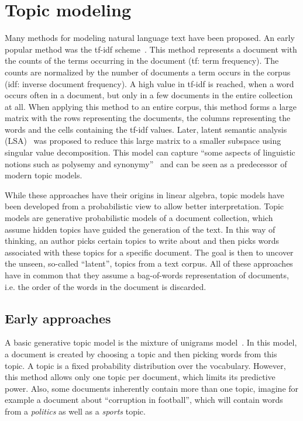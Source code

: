 \documentclass[
        a4paper,
        titlepage,
        twoside,
        parskip,
        numbers=noenddot
        ]{scrbook}
\theoremstyle{break}
\begin{document}
\section{Topic modeling}
Many methods for modeling natural language text have been proposed.
An early popular method was the tf-idf scheme~\cite{SparckJones1972}.
This method represents a document with the counts of the terms occurring in the document (tf: term frequency).
The counts are normalized by the number of documents a term occurs in the corpus (idf: inverse document frequency).
A high value in tf-idf is reached, when a word occurs often in a document, but only in a few documents in the entire collection at all.
When applying this method to an entire corpus, this method forms a large matrix with the rows representing the documents, the columns representing the words and the cells containing the tf-idf values.
Later, latent semantic analysis (LSA)~\cite{Deerwester1990} was proposed to reduce this large matrix to a smaller subspace using singular value decomposition.
This model can capture ``some aspects of linguistic notions such as polysemy and synonymy''~\cite{Blei2003} and can be seen as a predecessor of modern topic models.

While these approaches have their origins in linear algebra, topic models have been developed from a probabilistic view to allow better interpretation.
Topic models are generative probabilistic models of a document collection, which assume hidden topics have guided the generation of the text.
In this way of thinking, an author picks certain topics to write about and then picks words associated with these topics for a specific document.
The goal is then to uncover the unseen, so-called ``latent'', topics from a text corpus.
All of these approaches have in common that they assume a bag-of-words representation of documents, i.e. the order of the words in the document is discarded.

\subsection{Early approaches}
A basic generative topic model is the mixture of unigrams model~\cite{Nigam2000}.
In this model, a document is created by choosing a topic and then picking words from this topic.
A topic is a fixed probability distribution over the vocabulary.
However, this method allows only one topic per document, which limits its predictive power.
Also, some documents inherently contain more than one topic, imagine for example a document about ``corruption in football'', which will contain words from a \emph{politics} as well as a \emph{sports} topic.
\end{document}
